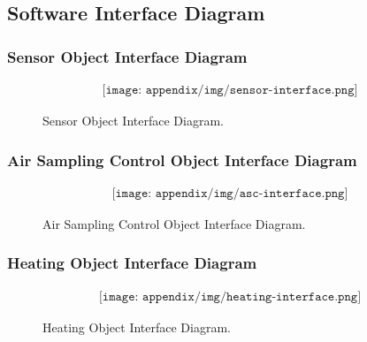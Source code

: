\subsection{Software Interface Diagram} \label{sec:appC}
\subsubsection{Sensor Object Interface Diagram} %
\begin{figure}[H]
    \begin{align*}
        \texttt{[image: appendix/img/sensor-interface.png]}
    \end{align*}
    \caption{Sensor Object Interface Diagram.}
    \label{fig:C1}
\end{figure}


\subsubsection{Air Sampling Control Object Interface Diagram} %
\begin{figure}[H]
    \begin{align*}
        \texttt{[image: appendix/img/asc-interface.png]}
    \end{align*}
    \caption{Air Sampling Control Object Interface Diagram.}
    \label{fig:C2}
\end{figure}


\subsubsection{Heating Object Interface Diagram} %
\begin{figure}[H]
    \begin{align*}
        \texttt{[image: appendix/img/heating-interface.png]}
    \end{align*}
    \caption{Heating Object Interface Diagram.}
    \label{fig:C3}
\end{figure}